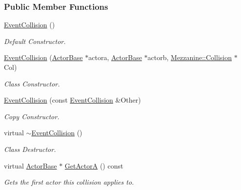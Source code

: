\subsubsection*{Public Member Functions}
\begin{DoxyCompactItemize}
\item 
\hypertarget{classMezzanine_1_1EventCollision_ae0813b544c1df94159e364b3a5720a6a}{
\hyperlink{classMezzanine_1_1EventCollision_ae0813b544c1df94159e364b3a5720a6a}{EventCollision} ()}
\label{classMezzanine_1_1EventCollision_ae0813b544c1df94159e364b3a5720a6a}

\begin{DoxyCompactList}\small\item\em Default Constructor. \item\end{DoxyCompactList}\item 
\hyperlink{classMezzanine_1_1EventCollision_affa8e2d9f0d20d33e8131fa05348879c}{EventCollision} (\hyperlink{classMezzanine_1_1ActorBase}{ActorBase} $\ast$actora, \hyperlink{classMezzanine_1_1ActorBase}{ActorBase} $\ast$actorb, \hyperlink{classMezzanine_1_1Collision}{Mezzanine::Collision} $\ast$Col)
\begin{DoxyCompactList}\small\item\em Class Constructor. \item\end{DoxyCompactList}\item 
\hyperlink{classMezzanine_1_1EventCollision_ae6917514b805e00607ce88ae01f52780}{EventCollision} (const \hyperlink{classMezzanine_1_1EventCollision}{EventCollision} \&Other)
\begin{DoxyCompactList}\small\item\em Copy Constructor. \item\end{DoxyCompactList}\item 
virtual \hyperlink{classMezzanine_1_1EventCollision_a72cabbfa2f7983d8b017755791e89632}{$\sim$EventCollision} ()
\begin{DoxyCompactList}\small\item\em Class Destructor. \item\end{DoxyCompactList}\item 
virtual \hyperlink{classMezzanine_1_1ActorBase}{ActorBase} $\ast$ \hyperlink{classMezzanine_1_1EventCollision_adb7943576f8033703f0afcbce43f56cc}{GetActorA} () const 
\begin{DoxyCompactList}\small\item\em Gets the first actor this collision applies to. \item\end{DoxyCompactList}\item 

\end{DoxyCompactItemize}

